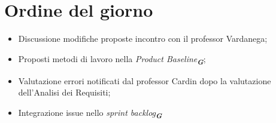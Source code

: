 

\section{Ordine del giorno}

\begin{itemize}
    \item Discussione modifiche proposte incontro con il professor Vardanega;
    \item Proposti metodi di lavoro nella \emph{Product Baseline}\textsubscript{\textit{\textbf{G}}};
    \item Valutazione errori notificati dal professor Cardin dopo la valutazione dell'Analisi dei Requisiti;
    \item Integrazione issue nello \emph{sprint backlog}\textsubscript{\textit{\textbf{G}}}
    
\end{itemize}